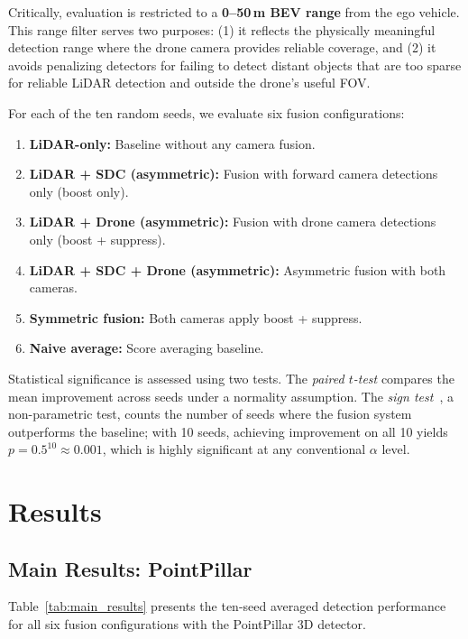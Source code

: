 \documentclass[sustainability,article,submit,moreauthors,pdftex]{Definitions/mdpi}
\begin{document}
Critically, evaluation is restricted to a \textbf{0--50\,m BEV range} from the ego vehicle. This range filter serves two purposes: (1) it reflects the physically meaningful detection range where the drone camera provides reliable coverage, and (2) it avoids penalizing detectors for failing to detect distant objects that are too sparse for reliable LiDAR detection and outside the drone's useful FOV.

For each of the ten random seeds, we evaluate six fusion configurations:

\begin{enumerate}[leftmargin=*,labelsep=4.9mm]
\item \textbf{LiDAR-only:} Baseline without any camera fusion.
\item \textbf{LiDAR + SDC (asymmetric):} Fusion with forward camera detections only (boost only).
\item \textbf{LiDAR + Drone (asymmetric):} Fusion with drone camera detections only (boost + suppress).
\item \textbf{LiDAR + SDC + Drone (asymmetric):} Asymmetric fusion with both cameras.
\item \textbf{Symmetric fusion:} Both cameras apply boost + suppress.
\item \textbf{Naive average:} Score averaging baseline.
\end{enumerate}

Statistical significance is assessed using two tests. The \emph{paired $t$-test} compares the mean improvement across seeds under a normality assumption. The \emph{sign test}~\cite{conover1999practical}, a non-parametric test, counts the number of seeds where the fusion system outperforms the baseline; with 10 seeds, achieving improvement on all 10 yields $p = 0.5^{10} \approx 0.001$, which is highly significant at any conventional $\alpha$ level.

\section{Results}\label{sec:results}

\subsection{Main Results: PointPillar}

Table~\ref{tab:main_results} presents the ten-seed averaged detection performance for all six fusion configurations with the PointPillar 3D detector.
\end{document}
